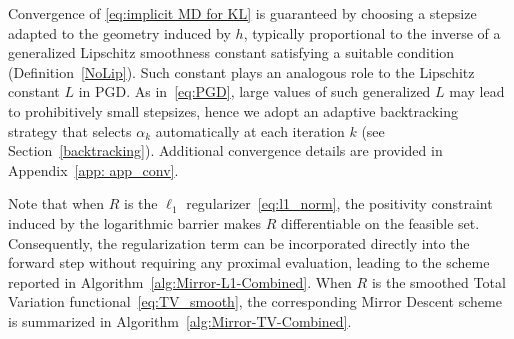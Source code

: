 \documentclass[letterpaper]{article}
\begin{document}
Convergence of \eqref{eq:implicit MD for KL} is guaranteed by choosing a stepsize adapted to the geometry induced by $h$, typically proportional to the inverse of a generalized Lipschitz smoothness constant satisfying a suitable  condition (Definition~\ref{NoLip}). Such constant  plays an analogous role to the Lipschitz constant $L$ in PGD. As in~\eqref{eq:PGD}, large values of such generalized $L$ may lead to prohibitively small stepsizes, hence we adopt an adaptive backtracking strategy that selects $\alpha_k$ automatically at each iteration $k$ (see Section~\ref{backtracking}). Additional convergence details are provided in Appendix~\ref{app: app_conv}.

Note that when $R$ is the $\ell_1$ regularizer~\eqref{eq:l1_norm}, the positivity constraint induced by the logarithmic barrier makes $R$ differentiable on the feasible set. Consequently, the regularization term can be incorporated directly into the forward step without requiring any proximal evaluation, leading to the scheme reported in Algorithm~\ref{alg:Mirror-L1-Combined}.  When $R$ is the smoothed Total Variation functional~\eqref{eq:TV_smooth}, the corresponding Mirror Descent scheme is summarized in Algorithm~\ref{alg:Mirror-TV-Combined}.

\end{document}
